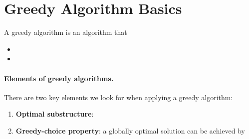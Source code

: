 \documentclass[11  pt]{article}
\begin{document}
%
%
%

\newpage

\section{Greedy Algorithm Basics}
A greedy algorithm is an algorithm that
\begin{itemize}
	\itemsep = 4em
	\item %
	
	\item %
\end{itemize}

\vs{1cm} 

\paragraph{Elements of greedy algorithms.} There are two key elements we look for when applying a greedy algorithm:
\begin{enumerate}
	\item \textbf{Optimal substructure}: %
	\item \textbf{Greedy-choice property}: a globally optimal solution can be achieved by
	 
\end{enumerate}
\end{document}
